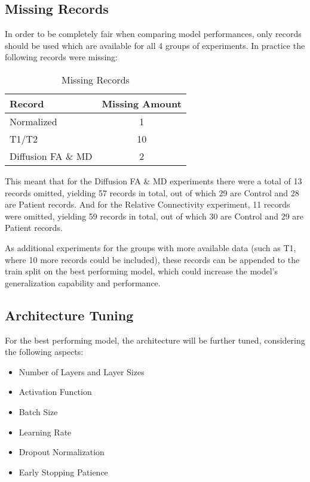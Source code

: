 \subsection{Missing Records}

In order to be completely fair when comparing model performances, only records should be used which are available for all 4 groups of experiments. In practice the following records were missing:
\begin{table}[H]
\centering
\begin{tabular}{|l|c|}
\hline
\textbf{Record} & \textbf{Missing Amount} \\ \hline
Normalized & 1 \\ \hline
T1/T2 & 10 \\ \hline
Diffusion \ac{FA} \& \ac{MD} & 2 \\ \hline
\end{tabular}
\caption{Missing Records}
\end{table}
This meant that for the Diffusion \ac{FA} \& \ac{MD} experiments there were a total of 13 records omitted, yielding 57 records in total, out of which 29 are Control and 28 are Patient records. And for the Relative Connectivity experiment, 11 records were omitted, yielding 59 records in total, out of which 30 are Control and 29 are Patient records.\par
As additional experiments for the groups with more available data (such as T1, where 10 more records could be included), these records can be appended to the train split on the best performing model, which could increase the model's generalization capability and performance.

\subsection{Architecture Tuning}

For the best performing model, the architecture will be further tuned, considering the following aspects:
\begin{itemize}
  \item Number of Layers and Layer Sizes
  \item Activation Function
  \item Batch Size
  \item Learning Rate
  \item Dropout Normalization
  \item Early Stopping Patience
\end{itemize}

